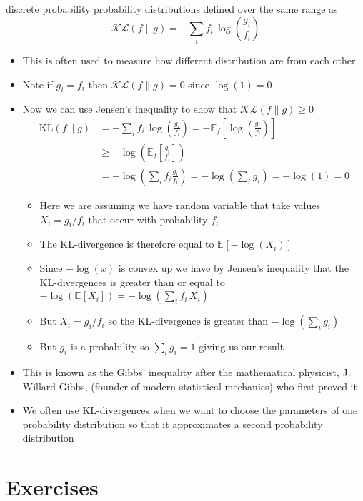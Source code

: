 \documentclass[11pt]{article}
\newcommand{\av}[2][]{\mathbb{E}_{#1\!}\left[ #2 \right]}
\newcommand{\logg}[1]{\log\!\left( #1 \right)}
\begin{document}
\begin{itemize}
\begin{itemize}
discrete probability probability distributions defined over the
same range as
$$ \mathcal{KL}(f \| g) = - \sum_i f_i \,  \logg{\frac{g_i}{f_i}} $$
\begin{itemize}
\item This is often used to measure how different distribution are
from each other
\item Note if \(g_i=f_i\) then \(\mathcal{KL}(f \| g) =0\) since \(\log(1)=0\)
\item Now we can use Jensen's inequality to show that
\(\mathcal{KL}(f \| g) \geq 0\)
\begin{align*}
\mathrm{KL}(f \| g) &= - \sum_i f_i \, \logg{\frac{g_i}{f_i}}
=- \av[f]{\logg{\frac{g_i}{f_i}}}\\
&\geq -\logg{\av[f]{\frac{g_i}{f_i}}} \\
&= - \logg{\sum_i f_i \frac{g_i}{f_i}} = -\logg{\sum_i g_i} = -\log(1)  = 0
\end{align*}
\begin{itemize}
\item Here we are assuming we have random variable that take
values \(X_i=g_i/f_i\) that occur with probability \(f_i\)
\item The KL-divergence is therefore equal to \(\av{-\log(X_i)}\)
\item Since \(-\log(x)\) is convex up we have by Jensen's
inequality that the KL-divergences is greater than or equal
to \(-\logg{\av{X_i}} = -\logg{\sum_i f_i\,X_i}\)
\item But \(X_i=g_i/f_i\) so the KL-divergence is greater than
\(-\logg{\sum_i g_i}\)
\item But \(g_i\) is a probability so \(\sum_i g_i=1\) giving us our result
\end{itemize}
\item This is known as the Gibbs' inequality after the mathematical
physicist, J. Willard Gibbs, (founder of modern statistical
mechanics) who first proved it
\item We often use KL-divergences when we want to choose the
parameters of one probability distribution so that it
approximates a second probability distribution
\end{itemize}
\end{itemize}
\end{itemize}

\section{Exercises}
\label{sec:org95a1adb}
\end{document}
